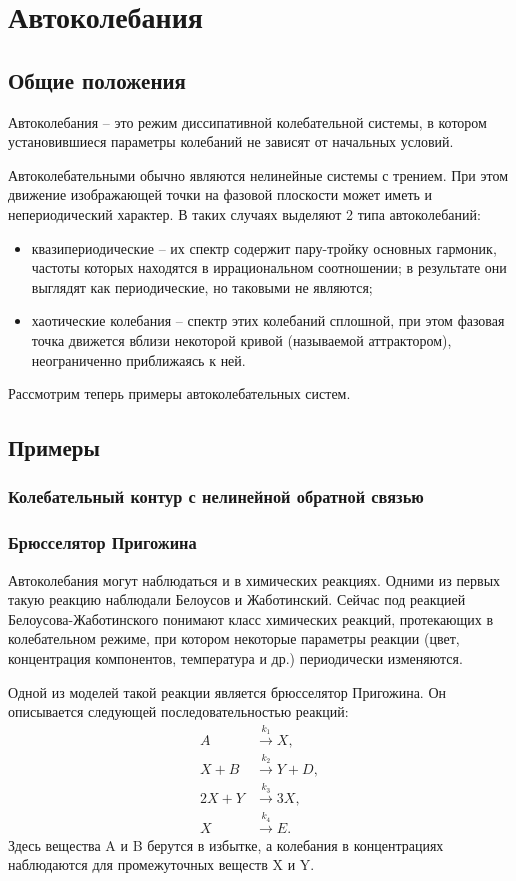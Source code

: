 \section{Автоколебания}
\subsection{Общие положения}

Автоколебания -- это режим диссипативной колебательной системы, в котором
установившиеся параметры колебаний не зависят от начальных условий.

Автоколебательными обычно являются нелинейные системы с трением. При этом
движение изображающей точки на фазовой плоскости может иметь и непериодический
характер. В таких случаях выделяют 2 типа автоколебаний:
\begin{itemize}
    \item квазипериодические -- их спектр содержит пару-тройку основных
        гармоник, частоты которых находятся в иррациональном соотношении; в
        результате они выглядят как периодические, но таковыми не являются;
    \item хаотические колебания -- спектр этих колебаний сплошной, при этом
        фазовая точка движется вблизи некоторой кривой (называемой аттрактором),
        неограниченно приближаясь к ней.
\end{itemize}

Рассмотрим теперь примеры автоколебательных систем.
\subsection{Примеры}

\subsubsection{Колебательный контур с нелинейной обратной связью}
\subsubsection{Брюсселятор Пригожина}
Автоколебания могут наблюдаться и в химических реакциях. Одними из первых такую
реакцию наблюдали Белоусов и Жаботинский. Сейчас под реакцией
Белоусова-Жаботинского понимают класс химических реакций, протекающих в
колебательном режиме, при котором некоторые параметры реакции (цвет,
концентрация компонентов, температура и др.) периодически изменяются.

Одной из моделей такой реакции является брюсселятор Пригожина. Он описывается
следующей последовательностью реакций:
\begin{align*}
    A      & \xrightarrow{k_1} X,\\
    X + B  & \xrightarrow{k_2} Y + D,\\
    2X + Y & \xrightarrow{k_3} 3X,\\
    X      & \xrightarrow{k_4} E.
\end{align*}
Здесь вещества A и B берутся в избытке, а колебания в концентрациях
наблюдаются для промежуточных веществ X и Y.

